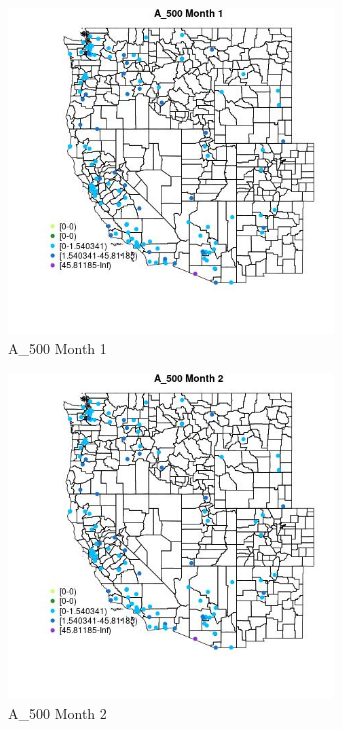 \begin{figure} 
\centering  
\includegraphics[width=0.77\textwidth]{Code_Outputs/Report_ML_input_PM25_Step4_part_e_de_duplicated_aves_MapObsMo1A_500.jpg} 
\caption{\label{fig:Report_ML_input_PM25_Step4_part_e_de_duplicated_avesMapObsMo1A_500}A_500 Month 1} 
\end{figure} 
 

\begin{figure} 
\centering  
\includegraphics[width=0.77\textwidth]{Code_Outputs/Report_ML_input_PM25_Step4_part_e_de_duplicated_aves_MapObsMo2A_500.jpg} 
\caption{\label{fig:Report_ML_input_PM25_Step4_part_e_de_duplicated_avesMapObsMo2A_500}A_500 Month 2} 
\end{figure} 
 

